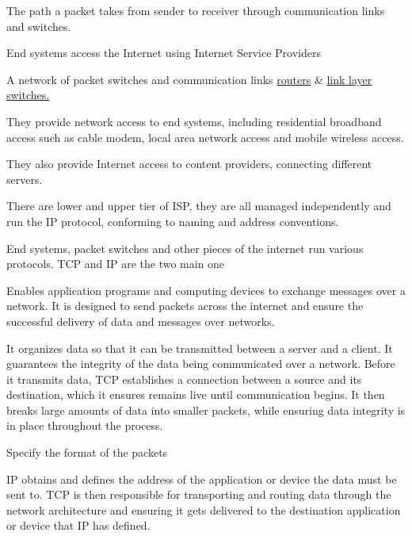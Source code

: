 \begin{definition}\label{def:route_path_1}
    The path a packet takes from sender to receiver through communication links and switches.    
\end{definition}

\newpage

\begin{note}\label{note:end_systems_2}
    End systems access the Internet using Internet Service Providers 
\end{note}


\begin{definition}[isp]\label{def:isp_1}
    A network of packet switches and communication links \hyperref[def:routers_1]{routers} \& \hyperref[def:link_layer_switches_1]{link layer switches.}
    
    They provide network access to end systems, including residential broadband access such as cable modem, local area network access and mobile wireless access. 

    They also provide Internet access to content providers, connecting different servers. 

    There are lower and upper tier of ISP, they are all managed independently and run the IP protocol, conforming to naming and address conventions.
\end{definition}

\begin{definition*}
    End systems, packet switches and other pieces of the internet run various protocols. TCP and IP are the two main one
    \begin{definition}\label{def:tcp_1}
         Enables application programs and computing devices to exchange messages over a network. It is designed to send packets across the internet and ensure the successful delivery of data and messages over networks.

         It organizes data so that it can be transmitted between a server and a client. It guarantees the integrity of the data being communicated over a network. Before it transmits data, TCP establishes a connection between a source and its destination, which it ensures remains live until communication begins. It then breaks large amounts of data into smaller packets, while ensuring data integrity is in place throughout the process.
    \end{definition}
    \begin{definition}\label{def:IP_1}
        Specify the format of the packets
    \end{definition}

    \begin{note}[differences]\label{note:ip_vs_tcp_1}
        IP obtains and defines the address of the application or device the data must be sent to. TCP is then responsible for transporting and routing data through the network architecture and ensuring it gets delivered to the destination application or device that IP has defined.
    \end{note}
\end{definition*}

